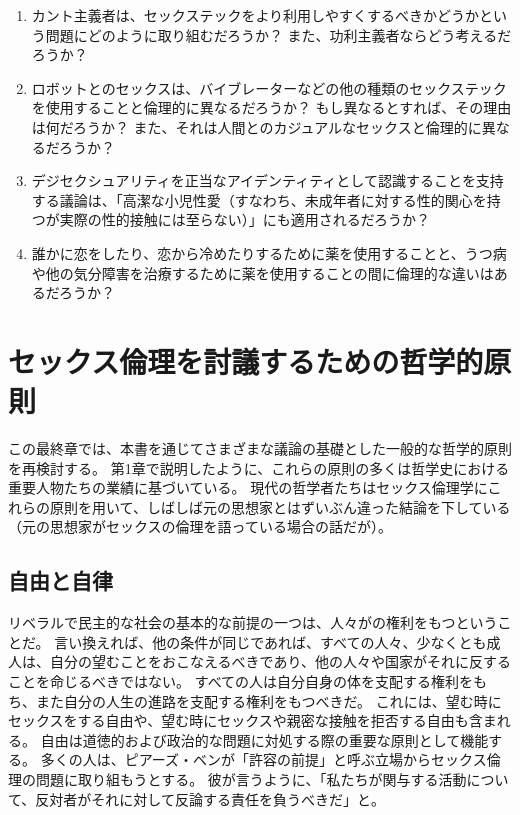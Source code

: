\documentclass[paper=a4,book,openany]{jlreq} \usepackage{mystyle}
\begin{document}
\begin{enumerate}
 \item カント主義者は、セックステックをより利用しやすくするべきかどうかという問題にどのように取り組むだろうか？ また、功利主義者ならどう考えるだろうか？
 \item ロボットとのセックスは、バイブレーターなどの他の種類のセックステックを使用することと倫理的に異なるだろうか？ もし異なるとすれば、その理由は何だろうか？ また、それは人間とのカジュアルなセックスと倫理的に異なるだろうか？
 \item デジセクシュアリティを正当なアイデンティティとして認識することを支持する議論は、「高潔な小児性愛（すなわち、未成年者に対する性的関心を持つが実際の性的接触には至らない）」にも適用されるだろうか？
 \item 誰かに恋をしたり、恋から冷めたりするために薬を使用することと、うつ病や他の気分障害を治療するために薬を使用することの間に倫理的な違いはあるだろうか？
\end{enumerate}

\chapter{セックス倫理を討議するための哲学的原則}

この最終章では、本書を通じてさまざまな議論の基礎とした一般的な哲学的原則を再検討する。
第1章で説明したように、これらの原則の多くは哲学史における重要人物たちの業績に基づいている。
現代の哲学者たちはセックス倫理学にこれらの原則を用いて、しばしば元の思想家とはずいぶん違った結論を下している（元の思想家がセックスの倫理を語っている場合の話だが）。

\section{自由と自律}

リベラルで民主的な社会の基本的な前提の一つは、人々がの権利をもつということだ。
言い換えれば、他の条件が同じであれば、すべての人々、少なくとも成人は、自分の望むことをおこなえるべきであり、他の人々や国家がそれに反することを命じるべきではない。
すべての人は自分自身の体を支配する権利をもち、また自分の人生の進路を支配する権利をもつべきだ。
これには、望む時にセックスをする自由や、望む時にセックスや親密な接触を拒否する自由も含まれる。
自由は道徳的および政治的な問題に対処する際の重要な原則として機能する。
多くの人は、ピアーズ・ベンが「許容の前提」と呼ぶ立場からセックス倫理の問題に取り組もうとする。
彼が言うように、「私たちが関与する活動について、反対者がそれに対して反論する責任を負うべきだ」と\citep[p.237]{benn99:_is_sex_moral_special}。
\end{document}
